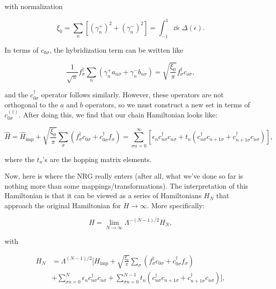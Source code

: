 with normalization

\begin{equation}
  \xi_0 = \sum_n\left[ (\gamma^+_n)^2 + (\gamma^-_n)^2 \right] = \int_{-1}^1 \dd\epsilon \; \Delta(\epsilon).
\end{equation}

In terms of $c_{0\sigma}$, the hybridization term can be written like

\begin{equation}
  \frac{1}{\sqrt{\pi}} f^\dagger_\sigma \sum_n \left( \gamma^+_n a_{n\sigma} + \gamma^-_n b_{n\sigma} \right) = \sqrt{\frac{\xi_0}{\pi}}f^\dagger_\sigma c_{o\sigma},
\end{equation}

and the $c^\dagger_{0\sigma}$ operator follows similarly. However, these operators are not orthogonal to the $a$ and $b$ operators, so we must construct a new set in terms of $c^{(\dagger)}_{0\sigma}$. After doing this, we find that our chain Hamiltonian looks like:

\begin{equation}
  \hat{H} = \hat{H}_{\mathrm{imp}} + \sqrt{\frac{\xi_0}{\pi}} \sum_\sigma \left( f^\dagger_\sigma c_{0\sigma} + c^\dagger_{0\sigma}f_\sigma \right) = \sum_{\sigma n=0}^{\infty} \left[ \epsilon_nc^\dagger_{n\sigma}c_{n\sigma} + t_n\left( c^\dagger_{n\sigma}c_{n+1\sigma} + c^\dagger_{n+1\sigma}c_{n\sigma} \right) \right],
\end{equation}

where the $t_n$'s are the hopping matrix elements.

Now, here is where the NRG really enters (after all, what we've done so far is nothing more than some mappings/transformations). The interpretation of this Hamiltonian is that it can be viewed as a series of Hamiltonians $H_N$ that approach the original Hamiltonian for $H \rightarrow \infty$. More specifically:

\begin{equation}
  H = \lim_{N\rightarrow\infty} \Lambda^{-(N-1)/2}H_N,
\end{equation}

with

\begin{align}
  H_N &= \Lambda^{(N-1)/2} \Bigg[ H_{\mathrm{imp}} + \sqrt{\frac{\xi_0}{\pi}}\sum_\sigma \left(f^\dagger_\sigma c_{0\sigma} + c^\dagger_{0\sigma}f_\sigma\right) \\
  & + \sum_{\sigma n=0}^{N} \epsilon_n c^\dagger_{n\sigma}c_{n\sigma} + \sum_{\sigma n=0}^{N-1}t_n\left( c^\dagger_{n\sigma}c_{n+1\sigma} + c^\dagger_{n+1\sigma}c_{n\sigma} \right) \Bigg],
\end{align}

